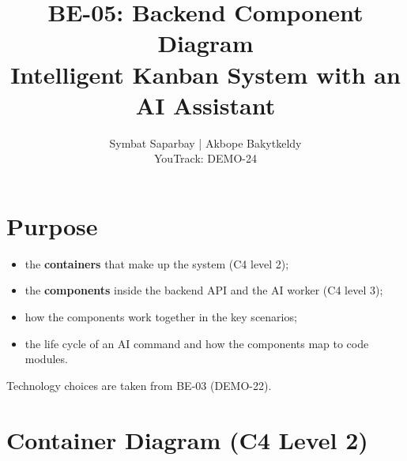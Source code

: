 \documentclass[11pt,a4paper]{article}
\title{\textbf{BE-05: Backend Component Diagram}\\[4pt]
\large Intelligent Kanban System with an AI Assistant}
\author{Symbat Saparbay | Akbope Bakytkeldy\\ \small YouTrack: DEMO-24}
\date{}
\begin{document}
\maketitle

\section{Purpose}

\begin{itemize}
  \item the \textbf{containers} that make up the system (C4 level 2);
  \item the \textbf{components} inside the backend API and the AI worker (C4 level 3);
  \item how the components work together in the key scenarios;
  \item the life cycle of an AI command and how the components map to code modules.
\end{itemize}
Technology choices are taken from BE-03 (DEMO-22).

\section{Container Diagram (C4 Level 2)}
\end{document}
